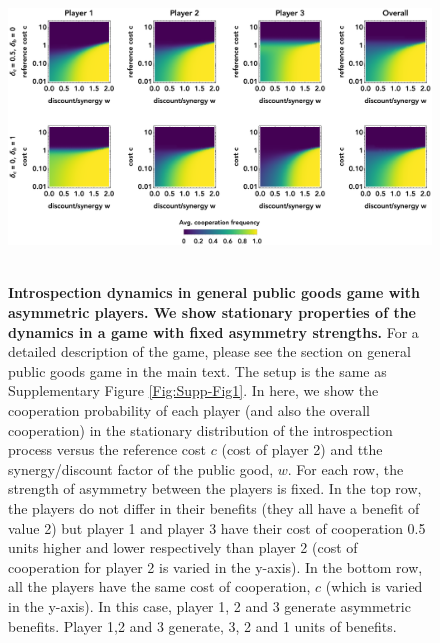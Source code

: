 \documentclass[11pt]{article}
\theoremstyle{plainCl1}
\theoremstyle{plainCl2}
\begin{document}
\begin{figure}
\centering
\includegraphics[width =  \textwidth]{figures/Supfigure2.eps}~\\[0.4cm]
\caption{\onehalfspacing
\textbf{Introspection dynamics in general public goods game with asymmetric players. We show stationary properties of the dynamics in a game with fixed asymmetry strengths.} For a detailed description of the game, please see the section on general public goods game in the main text. The setup is the same as Supplementary Figure \ref{Fig:Supp-Fig1}. In here, we show the cooperation probability of each player (and also the overall cooperation) in the stationary distribution of the introspection process versus the reference cost $c$ (cost of player 2) and tthe synergy/discount factor of the public good, $w$. For each row, the strength of asymmetry between the players is fixed. In the top row, the players do not differ in their benefits (they all have a benefit of value 2) but player 1 and player 3 have their cost of cooperation 0.5 units higher and lower respectively than player 2 (cost of cooperation for player 2 is varied in the y-axis). In the bottom row, all the players have the same cost of cooperation, $c$ (which is varied in the y-axis). In this case, player 1, 2 and 3 generate asymmetric benefits. Player 1,2 and 3 generate, 3, 2 and 1 units of benefits. 
}
\label{Fig:Supp-Fig2}
\end{figure}
\end{document}
